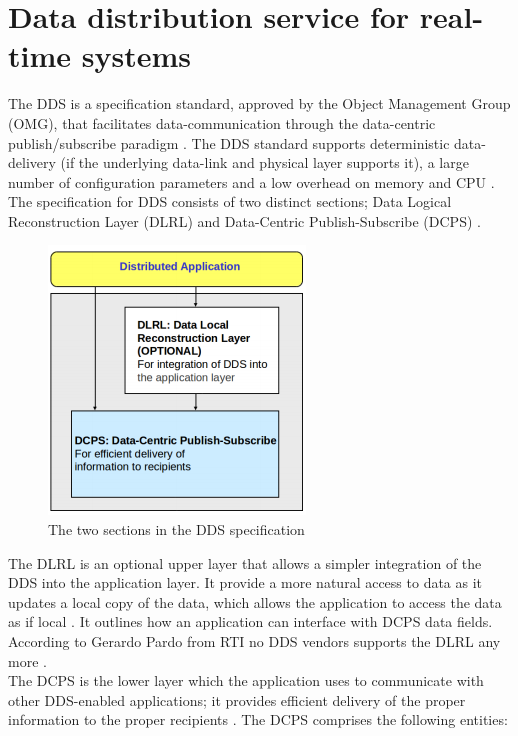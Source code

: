\documentclass[Main]{subfiles}
\begin{document}
\section{Data distribution service for real-time systems}
The DDS is a specification standard, approved by the Object Management Group (OMG), that facilitates data-communication through the data-centric publish/subscribe paradigm \cite{RTI}. The DDS standard supports deterministic data-delivery (if the underlying data-link and physical layer supports it), a large number of configuration parameters and a low overhead on memory and CPU \cite{DDS-slides}.\\
The specification for DDS consists of two distinct sections; Data Logical Reconstruction Layer (DLRL) and Data-Centric Publish-Subscribe (DCPS) \cite{DDS-slides}.


\begin{figure}[H]
\centering
\includegraphics[scale=0.8]{Figure/DLRLandDCPS.png}
\caption{The two sections in the DDS specification \cite{DDS-slides}}
\label{Fig:DLRL}
\end{figure}

The DLRL is an optional upper layer that allows a simpler integration of the DDS into the application layer. It provide a more natural access to data as it updates a local copy of the data, which allows the application to access the data as if local \cite{DDS-slides}. It outlines how an application can interface with DCPS data fields. According to Gerardo Pardo from RTI no DDS vendors supports the DLRL any more \cite{DLRL-support}.\\
The DCPS is the lower layer which the application uses to communicate with other DDS-enabled applications; it provides efficient delivery of the proper information to the proper recipients \cite{wiki-DDS}. The DCPS comprises the following entities:
\end{document}
